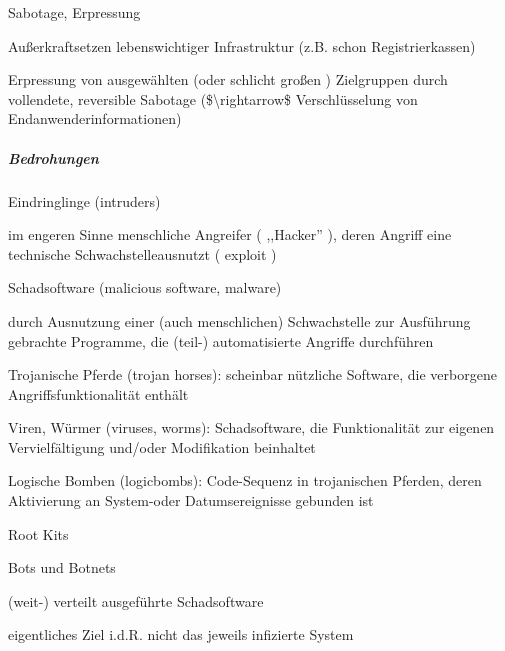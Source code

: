 \documentclass[a4paper]{article}
\begin{document}
\begin{multicols}{3}
    \begin{enumerate*}
        \setcounter{enumi}{4}
        \item
        Sabotage, Erpressung
    \end{enumerate*}

    \begin{itemize*}
        \item
        Außerkraftsetzen lebenswichtiger Infrastruktur (z.B. schon
        Registrierkassen)
        \item
        Erpressung von ausgewählten (oder schlicht großen ) Zielgruppen durch
        vollendete, reversible Sabotage (\$\textbackslash rightarrow\$
        Verschlüsselung von Endanwenderinformationen)
    \end{itemize*}


    \subparagraph{Bedrohungen}

    \begin{enumerate*}
        \item
        Eindringlinge (intruders)
        \begin{itemize*}
            \item im engeren Sinne menschliche Angreifer ( ,,Hacker'' ), deren Angriff eine technische Schwachstelleausnutzt ( exploit )
        \end{itemize*}
        \item
        Schadsoftware (malicious software, malware)
        \begin{itemize*}
            \item durch Ausnutzung einer (auch menschlichen) Schwachstelle zur Ausführung gebrachte Programme, die (teil-) automatisierte Angriffe durchführen
            \item Trojanische Pferde (trojan horses): scheinbar nützliche Software, die verborgene Angriffsfunktionalität enthält
            \item Viren, Würmer (viruses, worms): Schadsoftware, die Funktionalität zur eigenen Vervielfältigung und/oder Modifikation beinhaltet
            \item Logische Bomben (logicbombs): Code-Sequenz in trojanischen Pferden, deren Aktivierung an System-oder Datumsereignisse gebunden ist
            \item Root Kits
        \end{itemize*}
        \item
        Bots und Botnets
        \begin{itemize*}
            \item (weit-) verteilt ausgeführte Schadsoftware
            \item eigentliches Ziel i.d.R. nicht das jeweils infizierte System
        \end{itemize*}
    \end{enumerate*}



\end{multicols}
\end{document}
